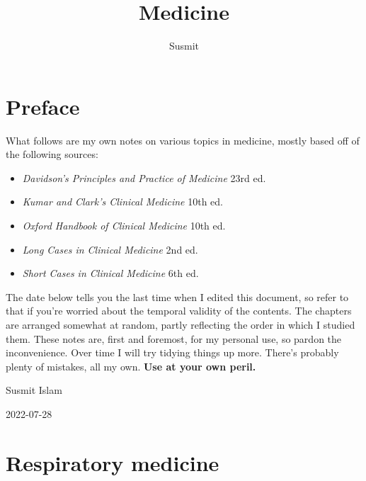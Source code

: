 \documentclass[
  12pt,
]{memoir}
\title{Medicine}
\author{Susmit}
\date{}
\providecommand{\tightlist}{%
  \setlength{\itemsep}{0pt}\setlength{\parskip}{0pt}}
\begin{document}
\frontmatter

\maketitle

\mainmatter
\renewcommand{\labelitemi}{$\blacktriangleright$}
\renewcommand{\labelitemii}{$\boldsymbol\circ$}
\renewcommand{\labelitemiii}{$\bullet$}
\renewcommand{\labelitemiv}{\tiny$\blacksquare$}

\openany
\raggedbottom
\twocoltocetc
\tableofcontents

\pagebreak

\hypertarget{preface}{%
\chapter*{Preface}\label{preface}}

What follows are my own notes on various topics in medicine, mostly
based off of the following sources:

\begin{itemize}
\tightlist
\item
  \emph{Davidson's Principles and Practice of Medicine} 23rd ed.
\item
  \emph{Kumar and Clark's Clinical Medicine} 10th ed.
\item
  \emph{Oxford Handbook of Clinical Medicine} 10th ed.
\item
  \emph{Long Cases in Clinical Medicine} 2nd ed.
\item
  \emph{Short Cases in Clinical Medicine} 6th ed.
\end{itemize}

The date below tells you the last time when I edited this document, so
refer to that if you're worried about the temporal validity of the
contents. The chapters are arranged somewhat at random, partly
reflecting the order in which I studied them. These notes are, first and
foremost, for my personal use, so pardon the inconvenience. Over time I
will try tidying things up more. There's probably plenty of mistakes,
all my own. \textbf{Use at your own peril.}

\hfill Susmit Islam

\hfill 2022-07-28

\hypertarget{respiratory-medicine}{%
\chapter{Respiratory medicine}\label{respiratory-medicine}}
\end{document}
